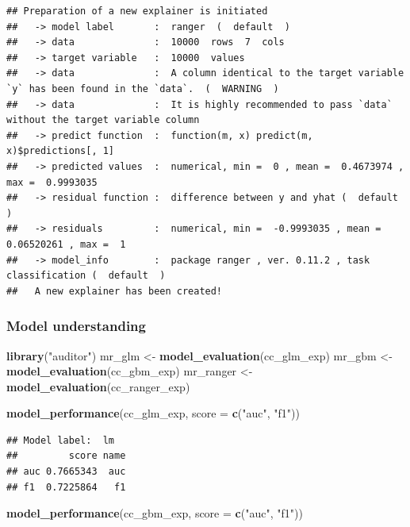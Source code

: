 \documentclass[12pt,]{krantz}
\newenvironment{Shaded}{\begin{snugshade}}{\end{snugshade}}
\newcommand{\DataTypeTok}[1]{\textcolor[rgb]{0.13,0.29,0.53}{#1}}
\newcommand{\KeywordTok}[1]{\textcolor[rgb]{0.13,0.29,0.53}{\textbf{#1}}}
\newcommand{\NormalTok}[1]{#1}
\newcommand{\StringTok}[1]{\textcolor[rgb]{0.31,0.60,0.02}{#1}}
\begin{document}
\begin{verbatim}
## Preparation of a new explainer is initiated
##   -> model label       :  ranger  (  default  )
##   -> data              :  10000  rows  7  cols 
##   -> target variable   :  10000  values 
##   -> data              :  A column identical to the target variable `y` has been found in the `data`.  (  WARNING  )
##   -> data              :  It is highly recommended to pass `data` without the target variable column
##   -> predict function  :  function(m, x) predict(m, x)$predictions[, 1] 
##   -> predicted values  :  numerical, min =  0 , mean =  0.4673974 , max =  0.9993035  
##   -> residual function :  difference between y and yhat (  default  )
##   -> residuals         :  numerical, min =  -0.9993035 , mean =  0.06520261 , max =  1  
##   -> model_info        :  package ranger , ver. 0.11.2 , task classification (  default  ) 
##   A new explainer has been created!
\end{verbatim}

\hypertarget{model-understanding-1}{%
\subsubsection{Model understanding}\label{model-understanding-1}}

\begin{Shaded}
\begin{Highlighting}[]
\KeywordTok{library}\NormalTok{(}\StringTok{"auditor"}\NormalTok{)}
\NormalTok{mr_glm <-}\StringTok{ }\KeywordTok{model_evaluation}\NormalTok{(cc_glm_exp)}
\NormalTok{mr_gbm <-}\StringTok{ }\KeywordTok{model_evaluation}\NormalTok{(cc_gbm_exp)}
\NormalTok{mr_ranger <-}\StringTok{ }\KeywordTok{model_evaluation}\NormalTok{(cc_ranger_exp)}

\KeywordTok{model_performance}\NormalTok{(cc_glm_exp, }\DataTypeTok{score =} \KeywordTok{c}\NormalTok{(}\StringTok{"auc"}\NormalTok{, }\StringTok{"f1"}\NormalTok{))}
\end{Highlighting}
\end{Shaded}

\begin{verbatim}
## Model label:  lm 
##         score name
## auc 0.7665343  auc
## f1  0.7225864   f1
\end{verbatim}

\begin{Shaded}
\begin{Highlighting}[]
\KeywordTok{model_performance}\NormalTok{(cc_gbm_exp, }\DataTypeTok{score =} \KeywordTok{c}\NormalTok{(}\StringTok{"auc"}\NormalTok{, }\StringTok{"f1"}\NormalTok{))}
\end{Highlighting}
\end{Shaded}
\end{document}
